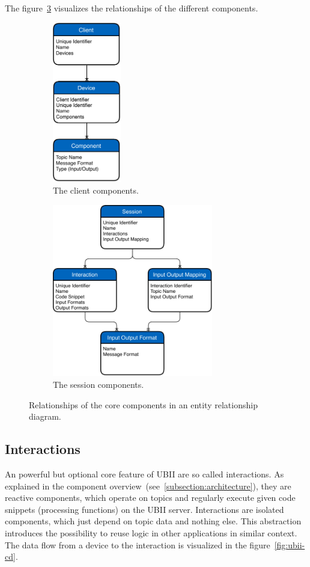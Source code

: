 The figure~\ref{fig:ubii-er} visualizes the relationships of the different components.

\begin{figure}[htpb]
  \centering
  \begin{subfigure}{.5\textwidth}
    \centering
    \includegraphics[width=3cm]{figures/ubii_er_client.pdf}
    \caption{The client components.}\label{fig:ubii-er-client}
  \end{subfigure}%
  \begin{subfigure}{.5\textwidth}
    \centering
    \includegraphics[width=7cm]{figures/ubii_er_server.pdf}
    \caption{The session components.}\label{fig:ubii-er-server}
  \end{subfigure}
  \caption[UBII Components Diagram]{Relationships of the core components in an entity relationship diagram.}\label{fig:ubii-er}
\end{figure}


\subsection{Interactions}\label{subsection:interactions}
An powerful but optional core feature of \ac{UBII} are so called interactions. As explained in the component overview~(see~\ref{subsection:architecture}), they are reactive components, which operate on topics and regularly execute given code snippets (processing functions) on the \ac{UBII} server. Interactions are isolated components, which just depend on topic data and nothing else. This abstraction introduces the possibility to reuse logic in other applications in similar context. The data flow from a device to the interaction is visualized in the figure~\ref{fig:ubii-cd}.

